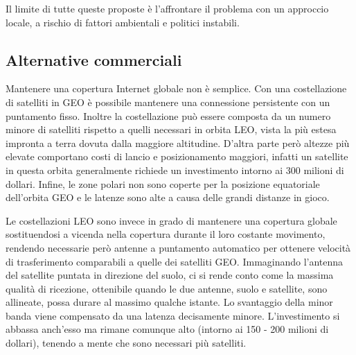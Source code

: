 \documentclass[12pt,a4paper,oneside]{book}
\begin{document}
			Il limite di tutte queste proposte è l'affrontare il problema con un approccio locale, a rischio di fattori ambientali e politici instabili. 
		
		\subsection{Alternative commerciali}
		Mantenere una copertura Internet globale non è semplice. Con una costellazione di satelliti in GEO è possibile mantenere una connessione persistente con un puntamento fisso. Inoltre la costellazione può essere composta da un numero minore di satelliti rispetto a quelli necessari in orbita LEO, vista la più estesa impronta a terra dovuta dalla maggiore altitudine.
		D'altra parte però altezze più elevate comportano costi di lancio e posizionamento maggiori, infatti un satellite in questa orbita generalmente richiede un investimento intorno ai 300 milioni di dollari. Infine, le zone polari non sono coperte per la posizione equatoriale dell'orbita GEO e le latenze sono alte a causa delle grandi distanze in gioco.
		
		Le costellazioni LEO sono invece in grado di mantenere una copertura globale sostituendosi a vicenda nella copertura durante il loro costante movimento, rendendo necessarie però antenne a puntamento automatico per ottenere velocità di trasferimento comparabili a quelle dei satelliti GEO. Immaginando l'antenna del satellite puntata in direzione del suolo, ci si rende conto come la massima qualità di ricezione, ottenibile quando le due antenne, suolo e satellite, sono allineate, possa durare al massimo qualche istante. Lo svantaggio della minor banda viene compensato da una latenza decisamente minore. L'investimento si abbassa anch'esso ma rimane comunque alto (intorno ai 150 - 200 milioni di dollari), tenendo a mente che sono necessari più satelliti.
		
\end{document}
